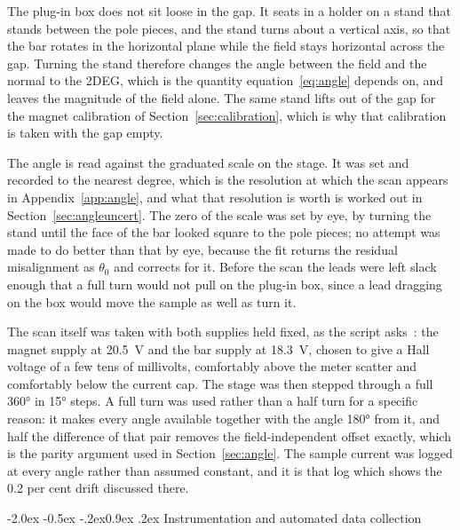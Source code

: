 \documentclass[11pt,a4paper]{article}
\makeatletter
\renewcommand\subsection{\@startsection{subsection}{2}{\z@}%
  {-2.0ex \@plus -0.5ex \@minus -.2ex}{0.9ex \@plus .2ex}%
  {\normalfont\normalsize\bfseries}}
\makeatother
\begin{document}
The plug-in box does not sit loose in the gap. It seats in a holder on a stand that stands
between the pole pieces, and the stand turns about a vertical axis, so that the bar rotates in
the horizontal plane while the field stays horizontal across the gap. Turning the stand
therefore changes the angle between the field and the normal to the 2DEG, which is the quantity
equation~\eqref{eq:angle} depends on, and leaves the magnitude of the field alone. The same
stand lifts out of the gap for the magnet calibration of Section~\ref{sec:calibration}, which
is why that calibration is taken with the gap empty.

The angle is read against the graduated scale on the stage. It was set and recorded to the
nearest degree, which is the resolution at which the scan appears in
Appendix~\ref{app:angle}, and what that resolution is worth is worked out in
Section~\ref{sec:angleuncert}. The zero of the scale was set by eye, by turning the stand until
the face of the bar looked square to the pole pieces; no attempt was made to do better than
that by eye, because the fit returns the residual misalignment as $\theta_0$ and corrects for
it. Before the scan the leads were left slack enough that a full turn would not pull on the
plug-in box, since a lead dragging on the box would move the sample as well as turn it.

The scan itself was taken with both supplies held fixed, as the script asks~\cite{script}: the
magnet supply at \qty{20.5}{\volt} and the bar supply at \qty{18.3}{\volt}, chosen to give a
Hall voltage of a few tens of millivolts, comfortably above the meter scatter and comfortably
below the current cap. The stage was then stepped through a full \ang{360} in \ang{15} steps.
A full turn was used rather than a half turn for a specific reason: it makes every angle
available together with the angle \ang{180} from it, and half the difference of that pair
removes the field-independent offset exactly, which is the parity argument used in
Section~\ref{sec:angle}. The sample current was logged at every angle rather than assumed
constant, and it is that log which shows the \num{0.2} per cent drift discussed there.

\subsection{Instrumentation and automated data collection}
\end{document}
